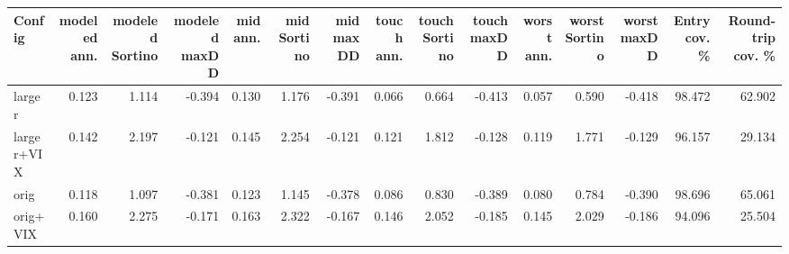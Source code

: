 \begin{tabular}{lrrrrrrrrrrrrrr}
\toprule
Config & modeled ann. & modeled Sortino & modeled maxDD & mid ann. & mid Sortino & mid maxDD & touch ann. & touch Sortino & touch maxDD & worst ann. & worst Sortino & worst maxDD & Entry cov. \% & Round-trip cov. \% \\
\midrule
larger & 0.123 & 1.114 & -0.394 & 0.130 & 1.176 & -0.391 & 0.066 & 0.664 & -0.413 & 0.057 & 0.590 & -0.418 & 98.472 & 62.902 \\
larger+VIX & 0.142 & 2.197 & -0.121 & 0.145 & 2.254 & -0.121 & 0.121 & 1.812 & -0.128 & 0.119 & 1.771 & -0.129 & 96.157 & 29.134 \\
orig & 0.118 & 1.097 & -0.381 & 0.123 & 1.145 & -0.378 & 0.086 & 0.830 & -0.389 & 0.080 & 0.784 & -0.390 & 98.696 & 65.061 \\
orig+VIX & 0.160 & 2.275 & -0.171 & 0.163 & 2.322 & -0.167 & 0.146 & 2.052 & -0.185 & 0.145 & 2.029 & -0.186 & 94.096 & 25.504 \\
\bottomrule
\end{tabular}
